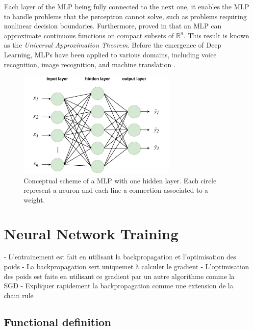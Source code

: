 Each layer of the \ac{MLP} being fully connected to the next one, it enables the
\ac{MLP} to handle problems that the perceptron cannot solve, such as problems
requiring nonlinear decision boundaries. Furthermore,
\citeauthor{cybenko1989approximation} proved in \cite{cybenko1989approximation}
that an \ac{MLP} can approximate continuous functions on compact subsets of
$\mathbb{R}^n$. This result is known as the \emph{Universal Approximation
Theorem}. Before the emergence of Deep Learning, \acp{MLP} have been applied to
various domains, including voice recognition, image recognition, and machine
translation \cite{wasserman1988neural}.


\begin{figure}[htbp]
  \centering
  \includegraphics[width=0.7\textwidth]{chapter_dlo/assets/mlp_scheme.pdf}
  \caption{Conceptual scheme of a \ac{MLP} with one hidden layer. Each circle
  represent a neuron and each line a connection associated to a weight.}
  \label{fig:dlo:mlp}
\end{figure}

\section{Neural Network Training}\label{sec:dlo:training}


- L'entrainement est fait en utilisant la backpropagation et l'optimisation des poids 
- La backpropagation sert uniquemet à calculer le gradient
- L'optimisation des poids est faite en utilisant ce gradient par un autre
algorithme comme la SGD 
- Expliquer rapidement la backpropagation comme une extension de la chain rule

\subsection{Functional definition}

